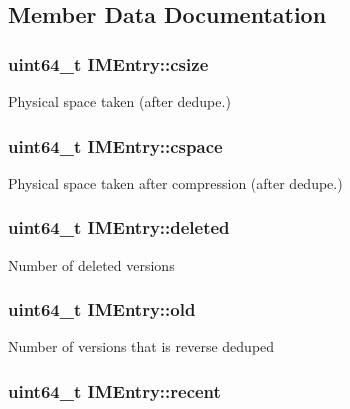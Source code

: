\subsection{\-Member \-Data \-Documentation}
\hypertarget{structIMEntry_a26e479602ebff2d35dde9675b955109e}{
\subsubsection[{csize}]{\setlength{\rightskip}{0pt plus 5cm}uint64\-\_\-t {\bf \-I\-M\-Entry\-::csize}}}\label{structIMEntry_a26e479602ebff2d35dde9675b955109e}
\-Physical space taken (after dedupe.) \hypertarget{structIMEntry_ae9b6648d5d7b3202d5eb238274d13045}{
\subsubsection[{cspace}]{\setlength{\rightskip}{0pt plus 5cm}uint64\-\_\-t {\bf \-I\-M\-Entry\-::cspace}}}\label{structIMEntry_ae9b6648d5d7b3202d5eb238274d13045}
\-Physical space taken after compression (after dedupe.) \hypertarget{structIMEntry_afd078d7ebeb106f755357249ebcc6259}{
\subsubsection[{deleted}]{\setlength{\rightskip}{0pt plus 5cm}uint64\-\_\-t {\bf \-I\-M\-Entry\-::deleted}}}\label{structIMEntry_afd078d7ebeb106f755357249ebcc6259}
\-Number of deleted versions \hypertarget{structIMEntry_abe5de096d4285431956070f601c8d086}{
\subsubsection[{old}]{\setlength{\rightskip}{0pt plus 5cm}uint64\-\_\-t {\bf \-I\-M\-Entry\-::old}}}\label{structIMEntry_abe5de096d4285431956070f601c8d086}
\-Number of versions that is reverse deduped \hypertarget{structIMEntry_acb4d7a375160308d5fb701a631685936}{
\subsubsection[{recent}]{\setlength{\rightskip}{0pt plus 5cm}uint64\-\_\-t {\bf \-I\-M\-Entry\-::recent}}}\label{structIMEntry_acb4d7a375160308d5fb701a631685936}
